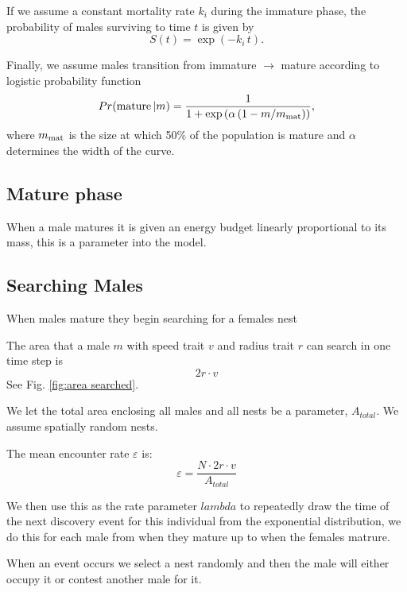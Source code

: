 \documentclass[a4paper,11pt]{article}
\begin{document}
If we assume a constant mortality rate $k_i$ during the immature phase, the probability of males surviving to time $t$ is given by
\begin{equation} \label{eq:surv_immature}
S(t) = \exp(-k_i \, t).
\end{equation}

Finally, we assume males transition from immature $\rightarrow$ mature according to logistic probability function
\begin{equation}\label{eq:allocation}
Pr({\rm mature} \, | m) = \frac1{1 + \exp\left(\alpha \left(1 - m / m_{\rm mat}\right)\right)},
\end{equation}
where $m_{\rm mat}$ is the size at which 50\% of the population is mature and $\alpha$ determines the width of the curve.

\subsection{Mature phase}
When a male matures it is given an energy budget linearly proportional to its mass, this is a parameter into the model.\\


\subsection{Searching Males}
When males mature they begin searching for a females nest

The area that a male $m$ with speed trait $v$ and radius trait $r$ can search in one time step is
\begin{equation}
    2r \cdot v
\end{equation}
See Fig. \ref{fig:area searched}.

We let the total area enclosing all males and all nests be a parameter, $A_{total}$. We assume spatially random nests.

The mean encounter rate $\varepsilon$ is:
\begin{equation} \label{eq:encounter rate}
    \varepsilon = \frac {N \cdot 2r\cdot v} {A_{total}}
\end{equation}
\citep{Gurarie2012}

We then use this as the rate parameter $lambda$ to repeatedly draw the time of the next discovery event for this individual from the exponential distribution, we do this for each male from when they mature up to when the females matrure.

When an event occurs we select a nest randomly and then the male will either occupy it or contest another male for it.
\end{document}
